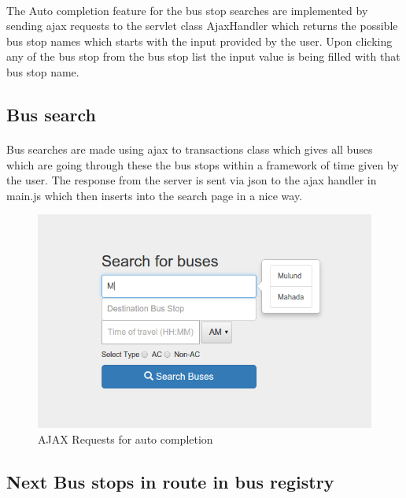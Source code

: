 \documentclass[11pt]{article}
\begin{document}
\paragraph{}	
The Auto completion feature for the  bus stop searches are implemented by sending ajax requests to the servlet class AjaxHandler which returns the possible bus stop names which starts with the input provided by the user. Upon clicking any of the bus stop from the bus stop list the input value is being filled with that bus stop name.

\subsection{Bus search} 

\paragraph{}	

Bus searches are made using ajax to transactions class which gives all buses which are going through these the bus stops within a framework of time given by the user.  The response from the server is sent via json to the ajax handler in main.js which then inserts into the search page in a nice way. 

\begin{figure}[ht!]
\center
\includegraphics[scale = 0.70]{shots/bussearch.png}
\caption{AJAX Requests for auto completion}
\label{overflow}
\end{figure}

\subsection{Next Bus stops in route in bus registry} 
\end{document}
